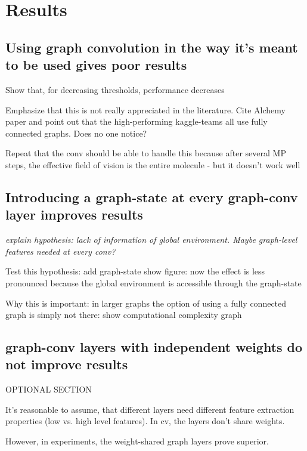 \chapter{Results}
\label{chapter:Results}

\section{Using graph convolution in the way it's meant to be used gives poor results}

{\itshape

Show that, for decreasing thresholds, performance decreases

Emphasize that this is not really appreciated in the literature.
Cite Alchemy paper and point out that the high-performing kaggle-teams all use fully connected graphs.
Does no one notice?

Repeat that the conv should be able to handle this because after several MP steps, the effective field of vision is the entire molecule - but it doesn't work well


}

\section{Introducing a graph-state at every graph-conv layer improves results}



{\itshape
explain hypothesis:
lack of information of global environment. Maybe graph-level features needed at every conv?

Test this hypothesis:
add graph-state
show figure: now the effect is less pronounced because the global environment is accessible through the graph-state

Why this is important:
in larger graphs the option of using a fully connected graph is simply not there:
show computational complexity graph

}


\section{graph-conv layers with independent weights do not improve results}

{\itshape
	
OPTIONAL SECTION

It's reasonable to assume, that different layers need different feature extraction properties (low vs. high level features). In cv, the layers don't share weights.

However, in experiments, the weight-shared graph layers prove superior.
}

